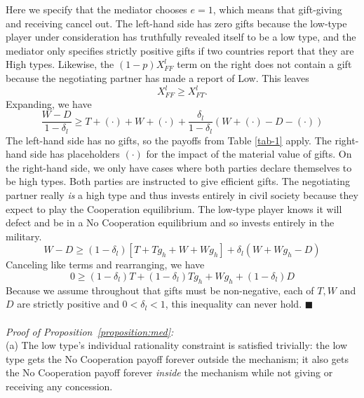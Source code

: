 \documentclass[bibtex,autowc]{apsr_submission}
\newcommand{\de}{\delta}
\newcommand{\al}{\alpha}
\begin{document}
{\vspace{-5pt}
Here we specify that the mediator chooses $e=1$, which means that gift-giving and receiving cancel out. The left-hand side has zero gifts because the low-type player under consideration has truthfully revealed itself to be a low type, and the mediator only specifies strictly positive gifts if two countries report that they are High types. Likewise, the $(1-p)X_{FF}^l$ term on the right does not contain a gift because the negotiating partner has made a report of Low. This leaves
		$$X_{FF}^l \geq X_{FT}^l.$$
		Expanding, we have
		\[
			\frac{W-D}{1-\de_l} \geq T + \left(\cdot \right) + W + \left(\cdot \right) + \frac{\de_l}{1-\de_l}\left(W+ \left(\cdot \right) -D - \left(\cdot \right) \right)
		\]
The left-hand side has no gifts, so the payoffs from Table \ref{tab-1} apply. The right-hand side has placeholders $\left(\cdot\right)$ for the impact of the material value of gifts. On the right-hand side, we only have cases where both parties declare themselves to be high types. Both parties are instructed to give efficient gifts. The negotiating partner really \emph{is} a high type and thus invests entirely in civil society because they expect to play the Cooperation equilibrium. The low-type player knows it will defect and be in a No Cooperation equilibrium and so invests entirely in the military. 
		\begin{equation}
			W-D \geq 
			\left(1-\de_l\right) \left[T + Tg_h + W + Wg_h \right] + \de_l \left(W + Wg_h -D \right)
			\label{eq:med}
		\end{equation}
Canceling like terms and rearranging, we have
    \[
	0 \geq \left(1 - \de_l \right) T + \left(1 - \de_l \right) Tg_h + Wg_h + \left(1 - \de_l \right) D
    \]
Because we assume throughout that gifts must be non-negative, each of $T, W$ and $D$ are strictly positive and $0 < \de_l < 1$, this inequality can never hold.	\hfill $\blacksquare$\\
			\\
\emph{Proof of Proposition~\ref{proposition:med}:}\\
(a) The low type's individual rationality constraint is satisfied trivially: the low type gets the No Cooperation payoff forever outside the mechanism; it also gets the No Cooperation payoff forever \emph{inside} the mechanism while not giving or receiving any concession.
\vspace{-5pt}

}
\end{document}
